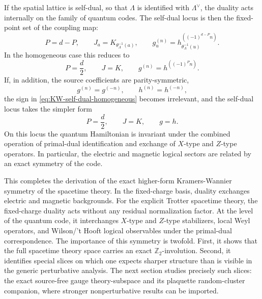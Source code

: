 \documentclass[dvipsnames,a4paper]{article}
\numberwithin{equation}{section}
\theoremstyle{definition}
\theoremstyle{remark}
\begin{document}
If the spatial lattice is self-dual, so that \(\Lambda\) is identified with \(\Lambda^\vee\),
the duality acts internally on the family of quantum codes. The self-dual locus is then the
fixed-point set of the coupling map:
\begin{equation}
	P=d-P,
	\qquad
	J_a=K_{\theta_\Lambda^{-1}(a)},
	\qquad
	g_u^{(n)}=h_{\theta_\Lambda^{-1}(u)}^{((-1)^{d-P}n)}.
	\label{eq:KW-self-dual-general}
\end{equation}
In the homogeneous case this reduces to
\begin{equation}
	P=\frac d2,
	\qquad
	J=K,
	\qquad
	g^{(n)}=h^{((-1)^P n)}.
	\label{eq:KW-self-dual-homogeneous}
\end{equation}
If, in addition, the source coefficients are parity-symmetric,
\begin{equation}
g^{(n)}=g^{(-n)},
\qquad
h^{(n)}=h^{(-n)},
\end{equation}
the sign in \eqref{eq:KW-self-dual-homogeneous} becomes irrelevant, and the self-dual locus
takes the simpler form
\begin{equation}
	P=\frac d2,
	\qquad
	J=K,
	\qquad
	g=h.
	\label{eq:KW-self-dual-simple}
\end{equation}
On this locus the quantum Hamiltonian is invariant under the combined operation of
primal-dual identification and exchange of \(X\)-type and \(Z\)-type operators. In
particular, the electric and magnetic logical sectors are related by an exact symmetry of
the code.

This completes the derivation of the exact higher-form Kramers-Wannier symmetry of the
spacetime theory. In the fixed-charge basis, duality exchanges electric and magnetic
backgrounds. For the explicit Trotter spacetime theory, the fixed-charge duality acts without any residual
normalization factor. At the level of the quantum code, it interchanges \(X\)-type and
\(Z\)-type stabilizers, local Weyl operators, and Wilson/'t Hooft logical observables under
the primal-dual correspondence. The importance of this symmetry is twofold. First, it
shows that the full spacetime theory space carries an exact \(\mathbb Z_2\)-involution.
Second, it identifies special slices on which one expects sharper structure than is visible
in the generic perturbative analysis. The next section studies precisely such slices: the
exact source-free gauge theory-subspace and its plaquette random-cluster companion, where stronger
nonperturbative results can be imported.
\end{document}
